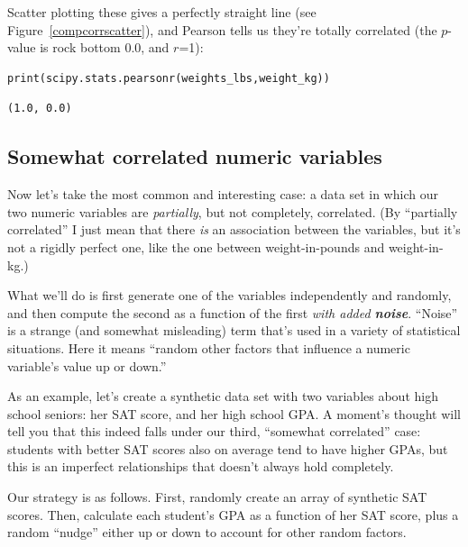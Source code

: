 Scatter plotting these gives a perfectly straight line (see
Figure~\ref{compcorrscatter}), and Pearson tells us they're totally correlated
(the $p$-value is rock bottom 0.0, and $r$=1):


\begin{Verbatim}[fontsize=\small,samepage=true,frame=single,framesep=3mm]
print(scipy.stats.pearsonr(weights_lbs,weight_kg))
\end{Verbatim}
\vspace{-.2in}

\begin{Verbatim}[fontsize=\small,samepage=true,frame=leftline,framesep=5mm,framerule=1mm]
(1.0, 0.0)
\end{Verbatim}

\subsection{Somewhat correlated numeric variables}

Now let's take the most common and interesting case: a data set in which our
two numeric variables are \textit{partially}, but not completely, correlated.
(By ``partially correlated'' I just mean that there \textit{is} an association
between the variables, but it's not a rigidly perfect one, like the one between
weight-in-pounds and weight-in-kg.)


What we'll do is first generate one of the variables independently and
randomly, and then compute the second as a function of the first \textit{with
added \textbf{noise}}. ``Noise'' is a strange (and somewhat misleading) term
that's used in a variety of statistical situations. Here it means ``random
other factors that influence a numeric variable's value up or down.''


As an example, let's create a synthetic data set with two variables about high
school seniors: her SAT score, and her high school GPA. A moment's thought
will tell you that this indeed falls under our third, ``somewhat correlated''
case: students with better SAT scores also on average tend to have higher GPAs,
but this is an imperfect relationships that doesn't always hold completely.


Our strategy is as follows. First, randomly create an array of synthetic SAT
scores. Then, calculate each student's GPA as a function of her SAT score,
plus a random ``nudge'' either up or down to account for other random factors.

